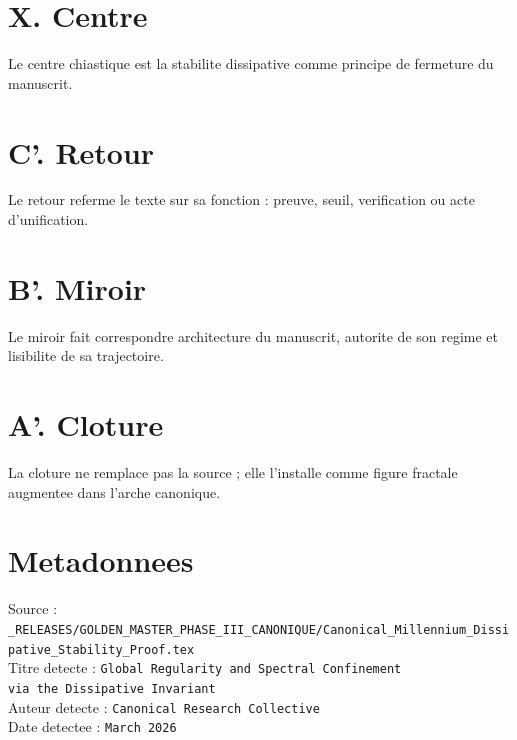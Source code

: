 \documentclass[11pt,a4paper]{article}
\begin{document}
\section*{X. Centre}
Le centre chiastique est la stabilite dissipative comme principe de fermeture du manuscrit.

\section*{C'. Retour}
Le retour referme le texte sur sa fonction : preuve, seuil, verification ou acte d'unification.

\section*{B'. Miroir}
Le miroir fait correspondre architecture du manuscrit, autorite de son regime et lisibilite de sa trajectoire.

\section*{A'. Cloture}
La cloture ne remplace pas la source ; elle l'installe comme figure fractale augmentee dans l'arche canonique.

\section*{Metadonnees}
Source : \verb|_RELEASES/GOLDEN_MASTER_PHASE_III_CANONIQUE/Canonical_Millennium_Dissipative_Stability_Proof.tex|\\
Titre detecte : \texttt{Global Regularity and Spectral Confinement\\ via the Dissipative Invariant}\\
Auteur detecte : \texttt{Canonical Research Collective}\\
Date detectee : \texttt{March 2026}
\end{document}
